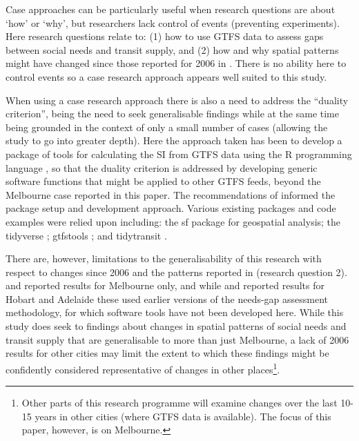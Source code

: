 \documentclass[preprint, 3p,
authoryear]{elsarticle} %
\begin{document}
Case approaches can be particularly useful when research questions are
about `how' or `why', but researchers lack control of events (preventing
experiments)\citep{Yin2009aa}. Here research questions relate to: (1)
how to use GTFS data to assess gaps between social needs and transit
supply, and (2) how and why spatial patterns might have changed since
those reported for 2006 in \citet{currie2010identifying}. There is no
ability here to control events so a case research approach appears well
suited to this study.

When using a case research approach there is also a need to address the
``duality criterion'', being the need to seek generalisable findings
while at the same time being grounded in the context of only a small
number of cases (allowing the study to go into greater
depth)\citep{Denscombe2007aa, Ketokivi2014aa}. Here the approach taken
has been to develop a package of tools for calculating the SI from GTFS
data using the R programming language \citep{R-base}, so that the
duality criterion is addressed by developing generic software functions
that might be applied to other GTFS feeds, beyond the Melbourne case
reported in this paper. The recommendations of \citet{wickham2023r}
informed the package setup and development approach. Various existing
packages and code examples were relied upon including: the sf package
\citep{R-sf} for geospatial analysis; the tidyverse
\citep{tidyverse2019}; gtfstools \citep{R-gtfstools}; and tidytransit
\citep{R-tidytransit}.

There are, however, limitations to the generalisability of this research
with respect to changes since 2006 and the patterns reported in
\citet{currie2010identifying}(research question 2).
\citet{Currie2007Identifying} and \citet{currie2010identifying} reported
results for Melbourne only, and while \citet{Currie2003Hobart} and
\citet{Currie2004Gap} reported results for Hobart and Adelaide these
used earlier versions of the needs-gap assessment methodology, for which
software tools have not been developed here. While this study does seek
to findings about changes in spatial patterns of social needs and
transit supply that are generalisable to more than just Melbourne, a
lack of 2006 results for other cities may limit the extent to which
these findings might be confidently considered representative of changes
in other places\footnote{Other parts of this research programme will
  examine changes over the last 10-15 years in other cities (where GTFS
  data is available). The focus of this paper, however, is on Melbourne.}.
\end{document}
